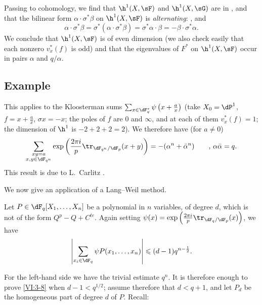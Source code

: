 Passing to cohomology, we find that $\h^1(X,\sF)$ and $\h^1(X,\sG)$ are in 
, and that the bilinear form 
$\alpha\cdot \sigma^\ast\beta$ on $\h^1(X,\sF)$ is \emph{alternating}: 
, and 
\[
  \alpha\cdot \sigma^\ast \beta = \sigma^\ast(\alpha\cdot \sigma^\ast \beta) = \sigma^\ast \alpha\cdot \beta = -\beta\cdot \sigma^\ast \alpha \text{.} 
\]
We conclude that $\h^1(X,\sF)$ is of even dimension (we also check 
    easily that each nonzero $v_x^\ast(f)$ is odd) and that the 
eigenvalues of $F^\ast$ on $\h^1(X,\sF)$ occur in pairs $\alpha$ and 
$q/\alpha$. 





\subsection{Example}\label{VI:3-7}

This applies to the Kloosterman sums 
$\sum_{x\in \dF_q^\ast} \psi\left(x+\frac a x\right)$ (take 
$X_0=\dP^1$, $f=x+\frac a x$, $\sigma x=-x$; the poles of $f$ are $0$ and 
$\infty$, and at each of them $v_x^\ast(f)=1$; the dimension of $\h^1$ is 
$-2+2+2=2$). We therefore have (for $a\ne 0$) 
\[
  \sum_{\substack{x y=a \\ x,y\in \dF_{q^n}}} \exp\left(\frac{2\pi i}{p} \tr_{\dF_{q^n}/\dF_p}(x+y)\right) = -(\alpha^n+\bar\alpha^n) \qquad \text{, }\alpha\bar \alpha = q \text{.} 
\]
This result is due to L.\ Carlitz . 

We now give an application of a Lang--Weil method. 





\begin{proposition_}\label{VI:3-8}
Let $P\in \dF_q[X_1,\dots,X_n]$ be a polynomial in $n$ variables, of degree 
$d$, which is not of the form $Q^p-Q+C^{te}$. Again setting 
$\psi(x) = \exp\left(\frac{2\pi i}{p} \tr_{\dF_q/\dF_p}(x)\right)$, we have 
\[
  \left|\sum_{x_i\in \dF_q} \psi P(x_1,\dots,x_n)\right| \leqslant (d-1) q^{n-\frac 1 2} \text{.}
\]
\end{proposition_}

For the left-hand side we have the trivial estimate $q^n$. It is therefore enough to 
prove \ref{VI:3-8} when $d-1<q^{1/2}$; assume therefore that 
$d<q+1$, and let $P_d$ be the homogeneous part of degree $d$ of $P$. Recall: 





